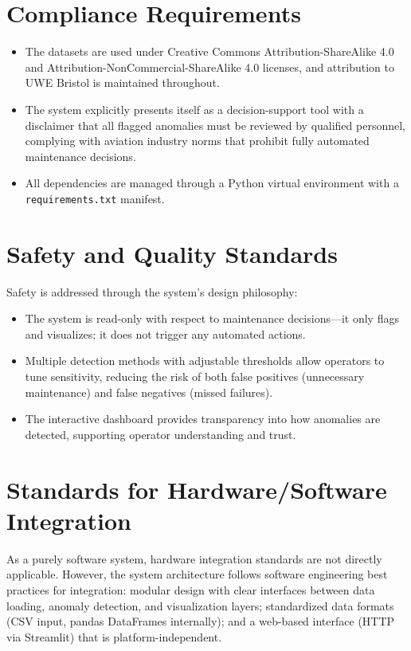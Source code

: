 \documentclass{CLS_zhou430}
\begin{document}
\section{Compliance Requirements}
\begin{itemize}
    \item The datasets are used under Creative Commons Attribution-ShareAlike 4.0 and Attribution-NonCommercial-ShareAlike 4.0 licenses, and attribution to UWE Bristol is maintained throughout.
    \item The system explicitly presents itself as a decision-support tool with a disclaimer that all flagged anomalies must be reviewed by qualified personnel, complying with aviation industry norms that prohibit fully automated maintenance decisions.
    \item All dependencies are managed through a Python virtual environment with a \texttt{requirements.txt} manifest.
\end{itemize}

\section{Safety and Quality Standards}
Safety is addressed through the system's design philosophy:
\begin{itemize}
    \item The system is read-only with respect to maintenance decisions---it only flags and visualizes; it does not trigger any automated actions.
    \item Multiple detection methods with adjustable thresholds allow operators to tune sensitivity, reducing the risk of both false positives (unnecessary maintenance) and false negatives (missed failures).
    \item The interactive dashboard provides transparency into how anomalies are detected, supporting operator understanding and trust.
\end{itemize}

\section{Standards for Hardware/Software Integration}
As a purely software system, hardware integration standards are not directly applicable. However, the system architecture follows software engineering best practices for integration: modular design with clear interfaces between data loading, anomaly detection, and visualization layers; standardized data formats (CSV input, pandas DataFrames internally); and a web-based interface (HTTP via Streamlit) that is platform-independent.
\end{document}
